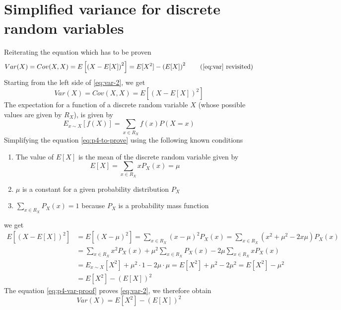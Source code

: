 \documentclass[]{article}
\begin{document}
    \section[P4: Simplified \texorpdfstring{$\sigma^2$}{variance}]{Simplified variance for discrete random variables}
    Reiterating the equation which has to be proven
    \begin{equation}
        Var(X) = Cov(X, X) = E \left [ \left (X - E[X] \right )^2 \right ] = E[X^2] - \left ( E[X] \right )^2
        \tag{\ref{eq:var} revisited}
        \label{eq:var-2}
    \end{equation}
    Starting from the left side of \ref{eq:var-2}, we get
    \begin{equation}
        \label{eq:p4-to-prove}
        Var(X) = Cov(X, X) = E \left [ \left (X - E[X] \right )^2 \right ]
    \end{equation}
    The expectation for a function of a discrete random variable $X$ (whose possible values are given by $R_X$), is given by
    \begin{equation}
        E_{x \sim X} \left [ f(X) \right ] = \sum_{x \in R_X} f(x) P(X=x)
    \end{equation}
    Simplifying the equation \ref{eq:p4-to-prove} using the following known conditions
    \begin{enumerate}
        \item The value of $E[X]$ is the mean of the discrete random variable given by \\
            \begin{equation}
                E[X] = \sum_{x \in R_X} x P_X(x) = \mu
            \end{equation}
        \item $\mu$ is a constant for a given probability distribution $P_X$
        \item $\sum_{x \in R_X} P_X(x) = 1$ because $P_X$ is a probability mass function
    \end{enumerate}
    we get
    \begin{equation}
        \label{eq:p4-var-proof}
        \begin{split}
            E \left [ \left (X - E[X] \right )^2 \right ] & = E \left [ \left (X - \mu \right )^2 \right ]
            = \sum_{x \in R_X} \left ( x - \mu \right )^2 P_X(x)
            = \sum_{x \in R_X} \left ( x^2 + \mu^2 - 2x\mu \right ) P_X(x) \\
            & = \sum_{x \in R_X} x^2 P_X(x) + \mu^2 \sum_{x \in R_X} P_X(x) - 2\mu \sum_{x \in R_X} x P_X(x) \\
            & = E_{x\sim X}[X^2] + \mu^2 \cdot 1 - 2\mu \cdot \mu = E[X^2] + \mu^2 - 2\mu^2 = E[X^2] - \mu^2 \\
            & = E[X^2] - \left ( E[X] \right )^2
        \end{split}
    \end{equation}
    The equation \ref{eq:p4-var-proof} proves \ref{eq:var-2}, we therefore obtain
    \begin{equation}
        Var(X) = E[X^2] - \left ( E[X] \right )^2
    \end{equation}
\end{document}
